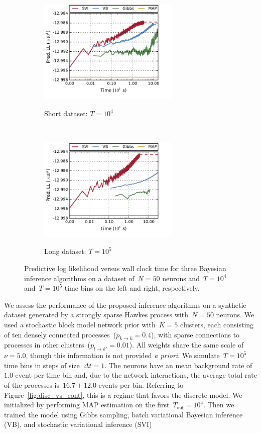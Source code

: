 \begin{figure}[t!]
  \begin{center}
    \begin{subfigure}[b]{0.48\linewidth}
      \caption{Short dataset: $T=10^4$}
      \centering
      \includegraphics[width=2.625in]{figures/ch4/figure2a.pdf} 
      \label{fig:synth_pll_short}
    \end{subfigure}
    ~
    \begin{subfigure}[b]{0.48\linewidth}
      \caption{Long dataset: $T=10^5$}
      \centering
      \includegraphics[width=2.625in]{figures/ch4/figure2b.pdf} 
      \label{fig:synth_pll_long}
    \end{subfigure}
    \caption[Predictive log likelihood versus wall clock time]{
      Predictive log likelihood versus wall clock time for three
      Bayesian inference algorithms on a dataset of~$N=50$ neurons
      and~$T=10^4$ and~$T=10^5$ time bins on the left and right,
      respectively.}
    \label{fig:synth_pll}
  \end{center}
\end{figure}


We assess the performance of the proposed inference algorithms on a
synthetic dataset generated by a strongly sparse Hawkes process
with~${N=50}$ neurons.  We used a stochastic block model network
prior with~${K=5}$ clusters, each consisting of ten densely connected
processes~(${p_{k\to k}=0.4}$), with sparse connections to processes
in other clusters~(${p_{l\to k'}=0.01}$).  All weights share the same
scale of~$\nu=5.0$, though this information is not provided \emph{a
  priori}.  We simulate~${T=10^5}$ time bins in steps of size~${\Delta
  t=1}$.  The neurons have an mean background rate of~$1.0$ event
per time bin and, due to the network interactions, the average total
rate of the processes is~$16.7 \pm 12.0$ events per bin.  Referring to
Figure~\ref{fig:disc_vs_cont}, this is a regime that favors the
discrete model.  We initialized by performing MAP estimation on the
first~$T_{\mathsf{init}}=10^4$.  Then we trained the model using Gibbs
sampling, batch variational Bayesian inference (VB), and stochastic
variational inference (SVI)

